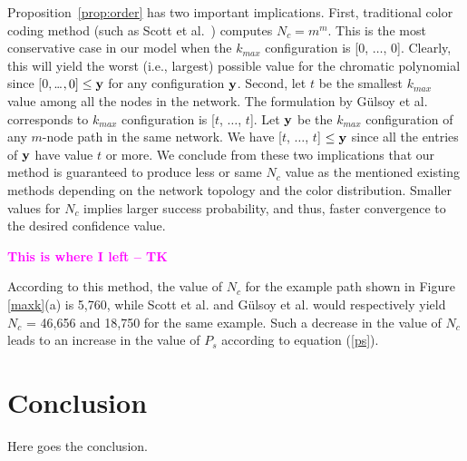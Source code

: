 \documentclass{ws-procs11x85}
\newcommand{\tk}[1]{{\bf {\textcolor{magenta}{#1 -- TK}}}}
\begin{document}
Proposition~\ref{prop:order} has two important implications. First,
traditional color coding method (such as Scott et al.~\cite{scott})
computes $N_c = m^m$. This is the most conservative case in our model
when the $k_{max}$ configuration is [0, $\ldots$, 0].  Clearly, this
will yield the worst (i.e., largest) possible value for the chromatic
polynomial since $[0, $\ldots$, 0] \leq {\bf y}$ for any configuration
${\bf y}$. Second, let $t$ be the smallest $k_{max}$ value among all
the nodes in the network. The formulation by G{\"u}lsoy et
al.\cite{gulsoy} corresponds to $k_{max}$ configuration is [$t$,
$\ldots$, $t$]. Let ${\bf y}$ be the $k_{max}$ configuration of any
$m$-node path in the same network. We have [$t$, $\ldots$, $t$] $\leq
{\bf y}$ since all the entries of ${\bf y}$ have value $t$ or more.
We conclude from these two implications that our method is guaranteed
to produce less or same $N_c$ value as the mentioned existing methods
depending on the network topology and the color distribution.  Smaller
values for $N_c$ implies larger success probability, and thus, faster
convergence to the desired confidence value.




\tk{This is where I left}




{\color {blue} According to this method, the value of $N_c$ for the
  example path shown in Figure \ref{maxk}(a) is 5,760, while Scott et
  al.\cite{scott} and G{\"u}lsoy et al.\cite{gulsoy} would
  respectively yield $N_c$ = 46,656 and 18,750 for the same example.
  Such a decrease in the value of $N_c$ leads to an increase in the
  value of $P_s$ according to equation (\ref{ps}). 
} 



\section{Conclusion}
Here goes the conclusion.




\end{document}

